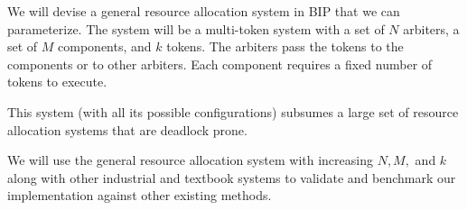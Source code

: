 We will devise a general resource allocation system
 in BIP  that we can parameterize.
 The system will be a multi-token system 
 with a set of $N$ arbiters, a set of $M$ components,
 and $k$ tokens. 
 The arbiters pass the tokens to the components or to other
 arbiters. 
 Each component requires a fixed number of tokens to 
 execute. 

 This system (with all its possible configurations)
 subsumes a large set of resource allocation
 systems that are deadlock prone. 

 We will use the general resource allocation system 
 with increasing $N, M,$ and $k$ 
 along with other industrial and textbook systems
 to validate and benchmark our implementation
 against other existing methods. 


